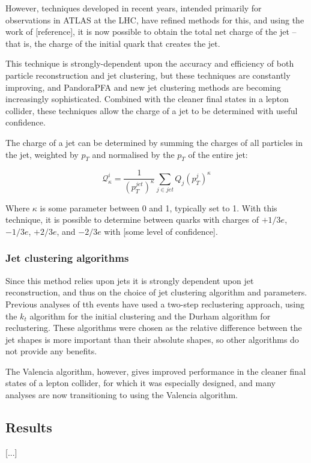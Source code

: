 However, techniques developed in recent years, intended primarily for observations in ATLAS at the LHC, have refined methods for this, and using the work of [reference], it is now possible to obtain the total net charge of the jet -- that is, the charge of the initial quark that creates the jet. 

This technique is strongly-dependent upon the accuracy and efficiency of both particle reconstruction and jet clustering, but these techniques are constantly improving, and \acrfull{PandoraPFA} and new jet clustering methods are becoming increasingly sophisticated. Combined with the cleaner final states in a lepton collider, these techniques allow the charge of a jet to be determined with useful confidence.

The charge of a jet can be determined by summing the charges of all particles in the jet, weighted by $p_T$ and normalised by the $p_T$ of the entire jet:
		
\begin{displaymath}
	\mathcal{Q}_\kappa^i = \frac{1}{(p_T^{jet})^\kappa} \sum_{j \in jet} Q_j (p_T^j)^\kappa
\end{displaymath}

Where $\kappa$ is some parameter between 0 and 1, typically set to 1. With this technique, it is possible to determine between quarks with charges of $+1/3e$, $-1/3e$, $+2/3e$, and $-2/3e$ with [some level of confidence].

\subsubsection{Jet clustering algorithms}
Since this method relies upon jets it is strongly dependent upon jet reconstruction, and thus on the choice of jet clustering algorithm and parameters. Previous analyses of tth events have used a two-step reclustering approach, using the $k_t$ algorithm for the initial clustering and the Durham algorithm for reclustering. These algorithms were chosen as the relative difference between the jet shapes is more important than their absolute shapes, so other algorithms do not provide any benefits.

The Valencia algorithm, however, gives improved performance in the cleaner final states of a lepton collider, for which it was especially designed, and many analyses are now transitioning to using the Valencia algorithm.

\subsection{Results}
[...]